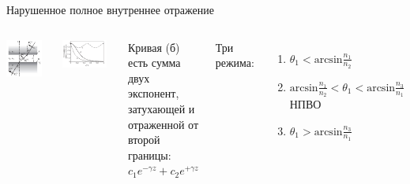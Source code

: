 \documentclass[9pt, compress, xcolor=table]{beamer}
\begin{document}
\begin{frame}{Нарушенное полное внутреннее отражение}

\begin{columns}[c]

\column{6.5cm}

\begin{center}
\includegraphics[width=0.9\textwidth]{fig2_05}
\end{center}

\column{6.5cm}
\begin{center}
\includegraphics[width=0.9\textwidth]{fig2_14}
\end{center}

Кривая (б) есть сумма двух экспонент, затухающей и отраженной от второй границы: $c_1 e^{-\gamma z}+c_2 e^{+\gamma z}$ 

Три режима:
\begin{enumerate}
    \item $\theta_1<\text{arcsin}\frac{n_1}{n_2}$
    \item $\text{arcsin}\frac{n_1}{n_2}<\theta_1<\text{arcsin}\frac{n_3}{n_1}$ НПВО
    \item $\theta_1>\text{arcsin}\frac{n_3}{n_1}$ 
\end{enumerate}
\end{columns}
\end{frame}
\end{document}
